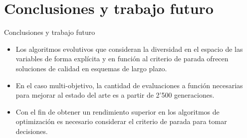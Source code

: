 \documentclass{beamer}
\begin{document}
\section{Conclusiones y trabajo futuro}
\begin{frame}{Conclusiones y trabajo futuro}
    \begin{itemize}
        \item Los algoritmos evolutivos que consideran la diversidad en el espacio de las variables de forma explícita y en función al criterio de parada ofrecen soluciones de calidad en esquemas de largo plazo. 
        \item En el caso multi-objetivo, la cantidad de evaluaciones a función necesarias para mejorar al estado del arte es a partir de 2'500 generaciones.
        \item Con el fin de obtener un rendimiento superior en los algoritmos de optimización es necesario considerar el criterio de parada para tomar decisiones.
    \end{itemize}
\end{frame}




\end{document}
